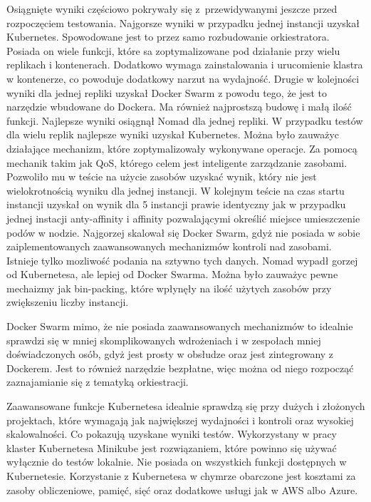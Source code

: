 \documentclass{iiuwb}
\begin{document}
Osiągnięte wyniki częściowo pokrywały się z~przewidywanymi jeszcze 
przed rozpoczęciem testowania. Najgorsze wyniki w przypadku jednej 
instancji uzyskał Kubernetes. Spowodowane jest to przez samo rozbudowanie 
orkiestratora. Posiada on wiele funkcji, które sa zoptymalizowane pod 
działanie przy wielu replikach i kontenerach. Dodatkowo wymaga 
zainstalowania i urucomienie klastra w kontenerze, co powoduje 
dodatkowy narzut na wydajność. Drugie w kolejności wyniki dla 
jednej repliki uzyskał Docker Swarm z powodu tego, że jest 
to narzędzie wbudowane do Dockera. Ma również najprostszą budowę 
i małą ilość funkcji. Najlepsze wyniki osiągnął Nomad dla jednej 
repliki. W przypadku testów dla wielu replik najlepsze wyniki uzyskał 
Kubernetes. Można było zauważyc działające mechanizm, które 
zoptymalizowały wykonywane operacje. Za pomocą mechanik takim 
jak QoS, którego celem jest inteligente zarządzanie zasobami.
Pozwoliło mu w teście na użycie zasobów uzyskać wynik, który nie jest 
wielokrotnością wyniku dla jednej instancji. W kolejnym teście 
na czas startu instancji uzyskał on wynik dla 5 instancji 
prawie identyczny jak w przypadku jednej instacji 
anty-affinity i affinity pozwalającymi określić miejsce umieszczenie 
podów w nodzie. Najgorzej skalował się Docker Swarm, gdyż nie posiada 
w sobie zaiplementowanych zaawansowanych mechanizmów kontroli nad 
zasobami. Istnieje tylko mozliwość podania na sztywno tych danych. 
Nomad wypadł gorzej od Kubernetesa, ale lepiej od Docker Swarma. 
Można było zauważyc pewne mechaizmy jak bin-packing, które wpłynęły 
na ilość użytych zasobów przy zwiększeniu liczby instancji.

Docker Swarm mimo, że nie posiada zaawansowanych mechanizmów to 
idealnie sprawdzi się w mniej skomplikowanych wdrożeniach 
i w zespołach mniej doświadczonych osób, gdyż jest prosty 
w obsłudze oraz jest zintegrowany z Dockerem. Jest to również 
narzędzie bezpłatne, więc można od niego rozpocząć zaznajamianie 
się z tematyką orkiestracji.

Zaawansowane funkcje Kubernetesa idealnie sprawdzą się przy dużych 
i złożonych projektach, które wymagają jak największej wydajności 
i kontroli oraz wysokiej skalowalności. Co pokazują uzyskane wyniki 
testów. Wykorzystany w pracy klaster Kubernetesa Minikube jest 
rozwiązaniem, które powinno się używać wyłącznie do testów lokalnie. 
Nie posiada on wszystkich funkcji dostępnych w Kubernetesie. 
Korzystanie z Kubernetesa w chymrze obarczone jest kosztami za 
zasoby obliczeniowe, pamięć, sięć oraz dodatkowe usługi jak 
w AWS albo Azure.
\end{document}
